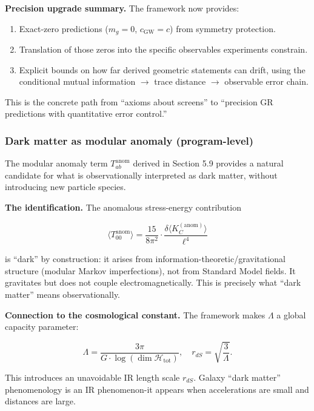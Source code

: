 \documentclass[11pt,a4paper]{article}
\theoremstyle{remark}
\providecommand{\tightlist}{%
  \setlength{\itemsep}{0pt}\setlength{\parskip}{0pt}}
\begin{document}
\textbf{Precision upgrade summary.} The framework now provides:

\begin{enumerate}
\def\labelenumi{\arabic{enumi}.}
\tightlist
\item
  Exact-zero predictions (\(m_g = 0\), \(c_{\mathrm{GW}} = c\)) from symmetry
  protection.
\item
  Translation of those zeros into the specific observables experiments
  constrain.
\item
  Explicit bounds on how far derived geometric statements can drift, using
  the conditional mutual information \ensuremath{\to} trace distance \ensuremath{\to} observable
  error chain.
\end{enumerate}

This is the concrete path from ``axioms about screens'' to ``precision GR
predictions with quantitative error control.''

\subsubsection{Dark matter as modular anomaly (program-level)}\label{dark-matter-as-modular-anomaly-program-level}

The modular anomaly term \(T_{ab}^{\mathrm{anom}}\) derived in Section 5.9 provides
a natural candidate for what is observationally interpreted as dark matter,
without introducing new particle species.

\textbf{The identification.} The anomalous stress-energy contribution

\[
\langle T_{00}^{\mathrm{anom}} \rangle
= \frac{15}{8\pi^2} \cdot \frac{\delta \langle K_C^{\mathrm{(anom)}} \rangle}{\ell^4}
\]

is ``dark'' by construction: it arises from information-theoretic/gravitational
structure (modular Markov imperfections), not from Standard Model fields. It
gravitates but does not couple electromagnetically. This is precisely what
``dark matter'' means observationally.

\textbf{Connection to the cosmological constant.} The framework makes \(\Lambda\) a
global capacity parameter:

\[
\Lambda = \frac{3\pi}{G \cdot \log(\dim \mathcal{H}_\mathrm{tot})},
\quad
r_{dS} = \sqrt{\frac{3}{\Lambda}}.
\]

This introduces an unavoidable IR length scale \(r_{dS}\). Galaxy ``dark matter''
phenomenology is an IR phenomenon-it appears when accelerations are small and
distances are large.
\end{document}
